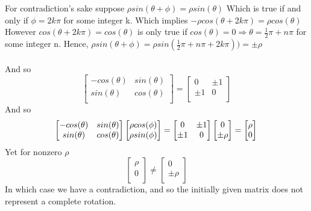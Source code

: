 \documentclass[letterpaper,12pt]{article}
\theoremstyle{definition}
\begin{document}
 For contradiction's sake suppose $\rho sin(\theta + \phi) = \rho sin(\theta)$ Which is true if and only if $\phi = 2k\pi$ for some integer k.
 Which implies $-\rho cos(\theta +2k\pi) = \rho cos(\theta)$ However $cos(\theta + 2k\pi) = cos(\theta)$ is only true if $cos(\theta) = 0 \Rightarrow  \theta =\frac{1}{2}\pi + n\pi$ for some integer n. Hence, $\rho sin(\theta + \phi) = \rho sin(\frac{1}{2}\pi + n\pi + 2k\pi)) = \pm \rho$ \\ \\
And so 
 \[\begin{bmatrix}
  -cos(\theta) & sin(\theta) \\
    sin(\theta) & cos(\theta) \\
 \end{bmatrix} = 
  \begin{bmatrix}
  0 & \pm 1 \\
    \pm 1 & 0 \\
 \end{bmatrix}
 \]
 And so \\
 \[\begin{bmatrix}
  -cos(\theta) & sin(\theta) \\
    sin(\theta) & cos(\theta) \\
 \end{bmatrix}
 \begin{bmatrix}
    \rho cos(\phi) \\
    \rho sin(\phi) \\
 \end{bmatrix}= 
  \begin{bmatrix}
  0 & \pm 1 \\
    \pm 1 & 0 \\
 \end{bmatrix}
 \begin{bmatrix}
    0 \\
    \pm \rho  \\
 \end{bmatrix} = 
  \begin{bmatrix}
    \rho \\
      0 \\
 \end{bmatrix}\\
 \]
 Yet for nonzero $\rho$ 
 \[\begin{bmatrix}
    \rho \\
      0 \\
 \end{bmatrix} \neq  \begin{bmatrix}
    0 \\
      \pm \rho \\
 \end{bmatrix}
 \]
 In which case we have a contradiction, and so the initially given matrix does not represent a complete rotation.\\
\end{document}
